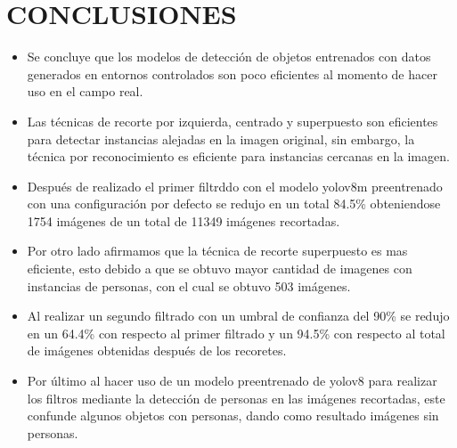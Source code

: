 \chapter*{CONCLUSIONES}

\begin{itemize}
  \item Se concluye que los modelos de detección de objetos entrenados con datos generados en entornos controlados son poco eficientes al momento de hacer uso en el campo real.
  \item Las técnicas de recorte por izquierda, centrado y superpuesto son eficientes para detectar instancias alejadas en la imagen original, sin embargo, la técnica por reconocimiento es eficiente para instancias cercanas en la imagen.
  \item Después de realizado el primer filtrddo con el modelo yolov8m preentrenado con una configuración por defecto se redujo en un total 84.5\% obteniendose 1754 imágenes de un total de 11349 imágenes recortadas.
  \item Por otro lado afirmamos que la técnica de recorte superpuesto es mas eficiente, esto debido a que se obtuvo mayor cantidad de imagenes con instancias de personas, con el cual se obtuvo 503 imágenes.
  \item Al realizar un segundo filtrado con un umbral de confianza del 90\% se redujo en un 64.4\% con respecto al primer filtrado y un 94.5\% con respecto al total de imágenes obtenidas después de los recoretes.
  \item Por último al hacer uso de un modelo preentrenado de yolov8 para realizar los filtros mediante la detección de personas en las imágenes recortadas, este confunde algunos objetos con personas, dando como resultado imágenes sin personas.
\end{itemize}